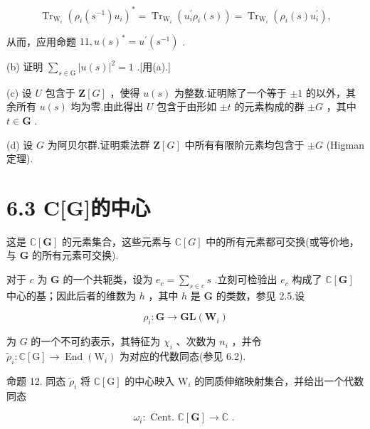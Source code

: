 \documentclass[10pt]{article}
\begin{document}
\[
{\operatorname{Tr}}_{{\mathrm{W}}_{i}}{\left( {\rho }_{i}\left( {s}^{-1}\right) {u}_{i}\right) }^{ * } = {\operatorname{Tr}}_{{\mathrm{W}}_{i}}\left( {{u}_{i}^{\prime }{\rho }_{i}\left( s\right) }\right)  = {\operatorname{Tr}}_{{\mathrm{W}}_{i}}\left( {{\rho }_{i}\left( s\right) {u}_{i}^{\prime }}\right) ,
\]

从而，应用命题 \({11},u{\left( s\right) }^{ * } = {u}^{\prime }\left( {s}^{-1}\right)\) .

(b) 证明 \(\mathop{\sum }\limits_{{s \in  \mathrm{G}}}{\left| u\left( s\right) \right| }^{2} = 1\) .[用(a).]

(c) 设 \(U\) 包含于 \(\mathbf{Z}\left\lbrack  G\right\rbrack\) ，使得 \(u\left( s\right)\) 为整数.证明除了一个等于 \(\pm  1\) 的以外，其余所有 \(u\left( s\right)\) 均为零.由此得出 \(U\) 包含于由形如 \(\pm  t\) 的元素构成的群 \(\pm  G\) ，其中 \(t \in  \mathbf{G}\) .

(d) 设 \(G\) 为阿贝尔群.证明乘法群 \(\mathbf{Z}\left\lbrack  G\right\rbrack\) 中所有有限阶元素均包含于 \(\pm  G\) (Higman定理).

\section*{6.3 C[G]的中心}

这是 \(\mathbb{C}\left\lbrack  \mathbf{G}\right\rbrack\) 的元素集合，这些元素与 \(\mathbb{C}\left\lbrack  G\right\rbrack\) 中的所有元素都可交换(或等价地，与 \(\mathbf{G}\) 的所有元素可交换).

对于 \(c\) 为 \(\mathbf{G}\) 的一个共轭类，设为 \({e}_{c} = \mathop{\sum }\limits_{{s \in  c}}s\) .立刻可检验出 \({e}_{c}\) 构成了 \(\mathbb{C}\left\lbrack  \mathbf{G}\right\rbrack\) 中心的基；因此后者的维数为 \(h\) ，其中 \(h\) 是 \(\mathbf{G}\) 的类数，参见 2.5.设

\[
{\rho }_{i} : \mathbf{G} \rightarrow  \mathbf{{GL}}\left( {\mathbf{W}}_{i}\right)
\]

为 \(G\) 的一个不可约表示，其特征为 \({\chi }_{i}\) 、次数为 \({n}_{i}\) ，并令 \({\widetilde{\rho }}_{i} : \mathbb{C}\left\lbrack  \mathrm{G}\right\rbrack   \rightarrow  \operatorname{End}\left( {\mathrm{W}}_{i}\right)\) 为对应的代数同态(参见 6.2).

命题 12. 同态 \({\widetilde{\rho }}_{i}\) 将 \(\mathbb{C}\left\lbrack  \mathrm{G}\right\rbrack\) 的中心映入 \({\mathrm{W}}_{i}\) 的同质伸缩映射集合，并给出一个代数同态

\[
{\omega }_{i} : \text{ Cent. }\mathbb{C}\left\lbrack  \mathbf{G}\right\rbrack   \rightarrow  \mathbb{C}\text{ . }
\]
\end{document}
